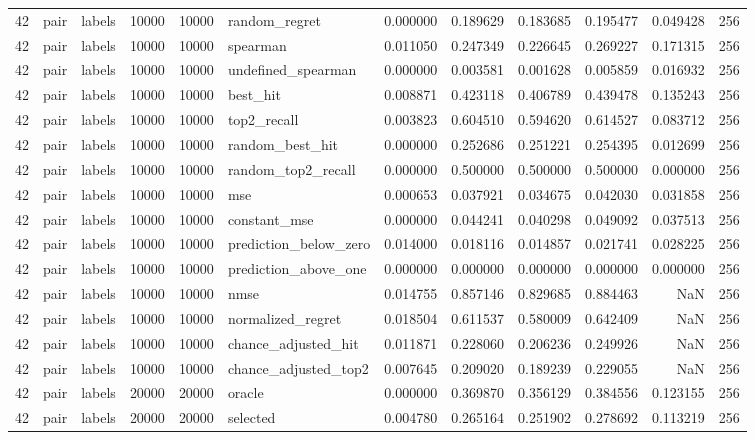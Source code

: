 \begin{tabular}{rllrrlrrrrrr}
42 & pair & labels & 10000 & 10000 & random_regret & 0.000000 & 0.189629 & 0.183685 & 0.195477 & 0.049428 & 256 \\
42 & pair & labels & 10000 & 10000 & spearman & 0.011050 & 0.247349 & 0.226645 & 0.269227 & 0.171315 & 256 \\
42 & pair & labels & 10000 & 10000 & undefined_spearman & 0.000000 & 0.003581 & 0.001628 & 0.005859 & 0.016932 & 256 \\
42 & pair & labels & 10000 & 10000 & best_hit & 0.008871 & 0.423118 & 0.406789 & 0.439478 & 0.135243 & 256 \\
42 & pair & labels & 10000 & 10000 & top2_recall & 0.003823 & 0.604510 & 0.594620 & 0.614527 & 0.083712 & 256 \\
42 & pair & labels & 10000 & 10000 & random_best_hit & 0.000000 & 0.252686 & 0.251221 & 0.254395 & 0.012699 & 256 \\
42 & pair & labels & 10000 & 10000 & random_top2_recall & 0.000000 & 0.500000 & 0.500000 & 0.500000 & 0.000000 & 256 \\
42 & pair & labels & 10000 & 10000 & mse & 0.000653 & 0.037921 & 0.034675 & 0.042030 & 0.031858 & 256 \\
42 & pair & labels & 10000 & 10000 & constant_mse & 0.000000 & 0.044241 & 0.040298 & 0.049092 & 0.037513 & 256 \\
42 & pair & labels & 10000 & 10000 & prediction_below_zero & 0.014000 & 0.018116 & 0.014857 & 0.021741 & 0.028225 & 256 \\
42 & pair & labels & 10000 & 10000 & prediction_above_one & 0.000000 & 0.000000 & 0.000000 & 0.000000 & 0.000000 & 256 \\
42 & pair & labels & 10000 & 10000 & nmse & 0.014755 & 0.857146 & 0.829685 & 0.884463 & NaN & 256 \\
42 & pair & labels & 10000 & 10000 & normalized_regret & 0.018504 & 0.611537 & 0.580009 & 0.642409 & NaN & 256 \\
42 & pair & labels & 10000 & 10000 & chance_adjusted_hit & 0.011871 & 0.228060 & 0.206236 & 0.249926 & NaN & 256 \\
42 & pair & labels & 10000 & 10000 & chance_adjusted_top2 & 0.007645 & 0.209020 & 0.189239 & 0.229055 & NaN & 256 \\
42 & pair & labels & 20000 & 20000 & oracle & 0.000000 & 0.369870 & 0.356129 & 0.384556 & 0.123155 & 256 \\
42 & pair & labels & 20000 & 20000 & selected & 0.004780 & 0.265164 & 0.251902 & 0.278692 & 0.113219 & 256 \\

\end{tabular}
